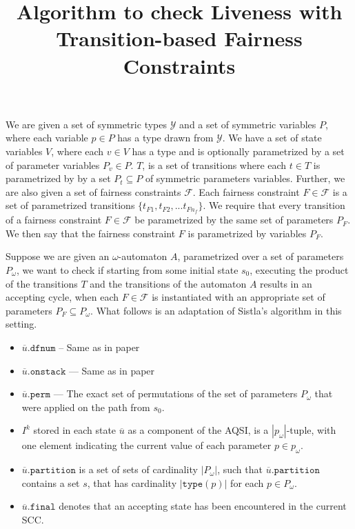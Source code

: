 \documentclass{article}[10pt]
\title{Algorithm to check Liveness with\\Transition-based Fairness Constraints}
\begin{document}
\begin{spacing}{1}
\maketitle

We are given a set of symmetric types $\mathcal{Y}$ and a set of symmetric
variables $P$, where each variable $p \in P$ has a type drawn from
$\mathcal{Y}$. We have a set of state variables $V$, where each $v \in V$
has a type and is optionally parametrized by a set of parameter variables
$P_v \in P$. $T$, is a set of transitions where each $t \in
T$ is parametrized by by a set $P_t \subseteq P$ of symmetric
parameters variables. Further, we are also given a set of fairness
constraints $\mathcal{F}$. Each fairness constraint $F \in \mathcal{F}$ is
a set of parametrized transitions $\{t_{F1}, t_{F2}, ... t_{Fn_f}\}$. 
We require that every transition of a fairness constraint
$F \in \mathcal{F}$ be parametrized by the same set of parameters $P_F$. We
then say that the fairness constraint $F$ is parametrized by variables $P_F$.

Suppose we are given an $\omega$-automaton $A$, parametrized over a
set of parameters $P_{\omega}$, we want to check if
starting from some initial state $s_0$, executing the product of the
transitions $T$ and the transitions of the automaton $A$ results in an
accepting cycle, when each $F \in \mathcal{F}$ is instantiated with an
appropriate set of parameters $P_F \subseteq P_{\omega}$.
What follows is an adaptation of Sistla's algorithm
in this setting.

\begin{itemize}
\item
$\overline{u}.\mathtt{dfnum}$ -- Same as in paper
\item
$\overline{u}.\mathtt{onstack}$ --- Same as in paper
\item
$\overline{u}.\mathtt{perm}$ --- The exact set of permutations
of the set of parameters $P_{\omega}$ that were applied on the path from $s_0$.
\item
$I^k$ stored in each state $\overline{u}$ as a component of the AQSI,
is a $|p_{\omega}|$-tuple, with one element indicating the current
value of each parameter $p \in p_{\omega}$.
\item
$\overline{u}.\mathtt{partition}$ is a set of sets of cardinality
  $|P_{\omega}|$, such that $\overline{u}.\mathtt{partition}$ contains a
  set $s$, that has cardinality $|\mathtt{type}(p)|$ for each $p \in
  P_{\omega}$.
\item
$\overline{u}.\mathtt{final}$ denotes that an accepting state has been 
  encountered in the current SCC.
\end{itemize}


\end{spacing}
\end{document}
